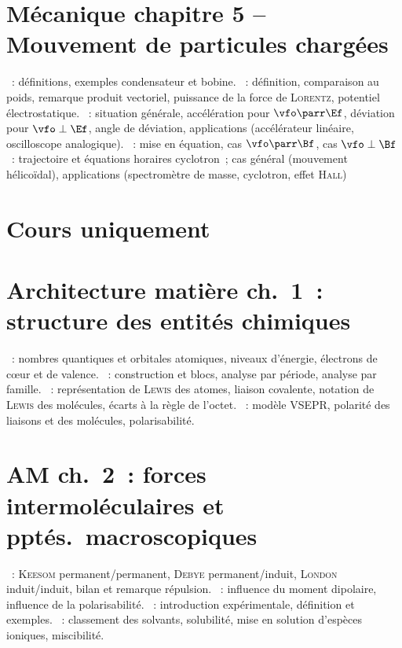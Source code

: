 \documentclass[a4paper, 12pt, final, garamond]{book}
\begin{document}
\section*{Mécanique chapitre 5 -- Mouvement de particules chargées}
\begin{enumerate}[label=\Roman*]
    ~: définitions, exemples condensateur
        et bobine.
    ~: définition, comparaison au poids,
        remarque produit vectoriel, puissance de la force de \textsc{Lorentz},
        potentiel électrostatique.
    ~: situation générale, accélération
        pour $\vfo\parr\Ef$, déviation pour $\vfo\perp\Ef$, angle de déviation,
        applications (accélérateur linéaire, oscilloscope analogique).
    ~: mise en équation, cas
        $\vfo\parr\Bf$, cas $\vfo\perp\Bf$~: trajectoire et équations horaires
        cyclotron~; cas général (mouvement hélicoïdal), applications
        (spectromètre de masse, cyclotron, effet \textsc{Hall})
\end{enumerate}

\section{Cours uniquement}
\section*{Architecture matière ch.\ 1~: structure des entités chimiques}
\begin{enumerate}[label=\Roman*]
    ~: nombres quantiques et
        orbitales atomiques, niveaux d'énergie, électrons de cœur et de valence.
    ~: construction et blocs, analyse par période,
        analyse par famille.
    ~: représentation de
        \textsc{Lewis} des atomes, liaison covalente, notation de \textsc{Lewis}
        des molécules, écarts à la règle de l'octet.
    ~: modèle VSEPR, polarité
        des liaisons et des molécules, polarisabilité.
\end{enumerate}

\section*{AM ch.\ 2~: forces intermoléculaires et pptés.\ macroscopiques}
\begin{enumerate}[label=\Roman*]
    ~: \textsc{Keesom}
        permanent/permanent, \textsc{Debye} permanent/induit, \textsc{London}
        induit/induit, bilan et remarque répulsion.
    ~: influence du moment dipolaire,
        influence de la polarisabilité.
    ~: introduction expérimentale, définition et
        exemples.
    ~: classement des solvants, solubilité, mise
        en solution d'espèces ioniques, miscibilité.
\end{enumerate}
\end{document}

